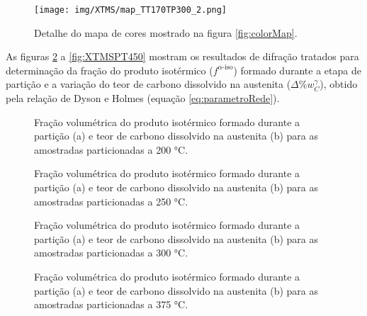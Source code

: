 \begin{figure}
	\texttt{[image: img/XTMS/map\_TT170TP300\_2.png]}
	\caption{Detalhe do mapa de cores mostrado na figura \ref{fig:colorMap}.}
	\label{fig:colorMap2}
\end{figure}

As figuras \ref{fig:XTMSPT200} a \ref{fig:XTMSPT450} mostram os resultados de difração tratados para determinação da fração do produto isotérmico ($f^{\alpha\text{-iso}}$) formado durante a etapa de partição e a variação do teor de carbono dissolvido na austenita ($\Delta\%w_C^\gamma$), obtido pela relação de Dyson e Holmes (equação \ref{eq:parametroRede}).

\begin{figure}
	\quad
	\caption{Fração volumétrica do produto isotérmico formado durante a partição (a) e teor de carbono dissolvido na austenita (b) para as amostradas particionadas a 200 °C.}
	\label{fig:XTMSPT200}
\end{figure}

\begin{figure}
	\quad
	\caption{Fração volumétrica do produto isotérmico formado durante a partição (a) e teor de carbono dissolvido na austenita (b) para as amostradas particionadas a 250 °C.}
	\label{fig:XTMSPT250}
\end{figure}

\begin{figure}
	\quad
	\caption{Fração volumétrica do produto isotérmico formado durante a partição (a) e teor de carbono dissolvido na austenita (b) para as amostradas particionadas a 300 °C.}
	\label{fig:XTMSPT300}
\end{figure}

\begin{figure}
	\quad
	\caption{Fração volumétrica do produto isotérmico formado durante a partição (a) e teor de carbono dissolvido na austenita (b) para as amostradas particionadas a 375 °C.}
	\label{fig:XTMSPT375}
\end{figure}

